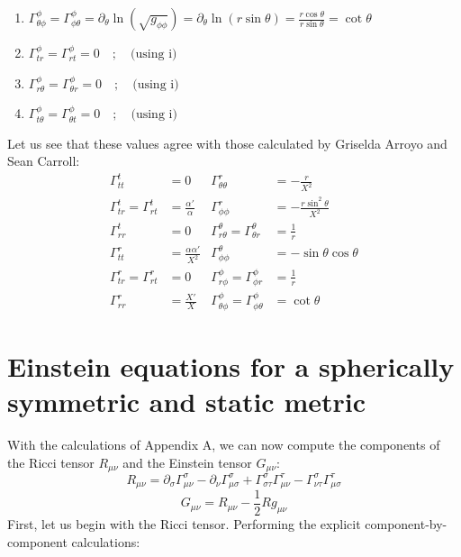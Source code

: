 \documentclass[12pt]{report}
\begin{document}
\begin{enumerate}
		\item $\Gamma^{\phi}_{\theta\phi} = \Gamma^{\phi}_{\phi\theta} = \partial_{\theta} \ln(\sqrt{g_{\phi\phi}}) = \partial_{\theta} \ln(r\sin\theta) = \frac{r\cos\theta}{r\sin\theta} = \cot\theta$ 
		
		\item $\Gamma^{\phi}_{tr} = \Gamma^{\phi}_{rt} = 0 \quad ; \quad\text{(using i)}$
		
		\item $\Gamma^{\phi}_{r\theta} = \Gamma^{\phi}_{\theta r} = 0 \quad ; \quad\text{(using i)} $
		
		\item $\Gamma^{\phi}_{t\theta} = \Gamma^{\phi}_{\theta t} = 0\quad ; \quad\text{(using i)}$
	\end{enumerate}
	Let us see that these values agree with those calculated by Griselda Arroyo and Sean Carroll:
	\begin{align*}
		\Gamma^t_{tt} &= 0 & \Gamma^r_{\theta\theta} &= -\frac{r}{X^2} \\
		\Gamma^t_{tr} = \Gamma^t_{rt} &= \frac{\alpha'}{\alpha} & \Gamma^r_{\phi\phi} &= -\frac{r\sin^2\theta}{X^2} \\
		\Gamma^t_{rr} &= 0 & \Gamma^\theta_{r\theta} = \Gamma^\theta_{\theta r} &= \frac{1}{r} \\
		\Gamma^r_{tt} &= \frac{\alpha\alpha'}{X^2} & \Gamma^\theta_{\phi\phi} &= -\sin\theta \cos\theta \\
		\Gamma^r_{tr} = \Gamma^r_{rt} &= 0 & \Gamma^\phi_{r\phi} = \Gamma^\phi_{\phi r} &= \frac{1}{r} \\
		\Gamma^r_{rr} &= \frac{X'}{X} & \Gamma^\phi_{\theta\phi} = \Gamma^\phi_{\phi\theta} &= \cot\theta
	\end{align*}
	\chapter{Einstein equations for a spherically symmetric and static metric  }
	With the calculations of Appendix A, we can now compute the components of the Ricci tensor $R_{\mu\nu}$ and the Einstein tensor $G_{\mu\nu}$:
	\begin{equation}
		R_{\mu\nu} = \partial_\sigma\Gamma^\sigma_{\mu\nu} - \partial_\nu\Gamma^\sigma_{\mu\sigma} + \Gamma^\sigma_{\sigma\tau}\Gamma^\tau_{\mu\nu} - \Gamma^\sigma_{\nu\tau}\Gamma^\tau_{\mu\sigma}
	\end{equation}
	\begin{equation}
		G_{\mu\nu} = R_{\mu\nu}- \dfrac{1}{2}Rg_{\mu\nu}
	\end{equation}
	First, let us begin with the Ricci tensor. Performing the explicit component-by-component calculations:
	
\end{document}
